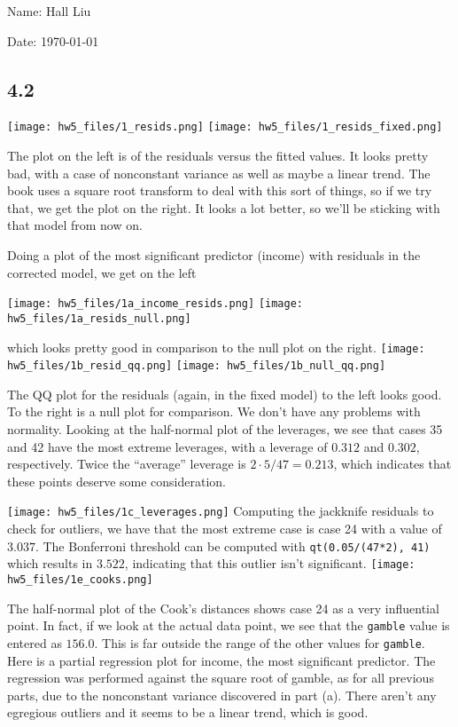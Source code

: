 \documentclass{article}
\begin{document}
Name: Hall Liu

Date: \today 
\vspace{1.5cm}

\subsection*{4.2}
\texttt{[image: hw5\_files/1\_resids.png]}
\texttt{[image: hw5\_files/1\_resids\_fixed.png]}

The plot on the left is of the residuals versus the fitted values. It looks pretty bad, with a case of nonconstant variance as well as maybe a linear trend. The book uses a square root transform to deal with this sort of things, so if we try that, we get the plot on the right. It looks a lot better, so we'll be sticking with that model from now on.

Doing a plot of the most significant predictor (income) with residuals in the corrected model, we get on the left

\texttt{[image: hw5\_files/1a\_income\_resids.png]}
\texttt{[image: hw5\_files/1a\_resids\_null.png]}

which looks pretty good in comparison to the null plot on the right.
\texttt{[image: hw5\_files/1b\_resid\_qq.png]}
\texttt{[image: hw5\_files/1b\_null\_qq.png]}

The QQ plot for the residuals (again, in the fixed model) to the left looks good. To the right is a null plot for comparison. We don't have any problems with normality.
Looking at the half-normal plot of the leverages, we see that cases 35 and 42 have the most extreme leverages, with a leverage of $0.312$ and $0.302$, respectively. Twice the ``average'' leverage is $2\cdot5/47=0.213$, which indicates that these points deserve some consideration.

\texttt{[image: hw5\_files/1c\_leverages.png]}
Computing the jackknife residuals to check for outliers, we have that the most extreme case is case 24 with a value of $3.037$. The Bonferroni threshold can be computed with \verb|qt(0.05/(47*2), 41)| which results in $3.522$, indicating that this outlier isn't significant.
\texttt{[image: hw5\_files/1e\_cooks.png]}

The half-normal plot of the Cook's distances shows case 24 as a very influential point. In fact, if we look at the actual data point, we see that the \verb|gamble| value is entered as $156.0$. This is far outside the range of the other values for \verb|gamble|. 
Here is a partial regression plot for income, the most significant predictor. The regression was performed against the square root of gamble, as for all previous parts, due to the nonconstant variance discovered in part (a). There aren't any egregious outliers and it seems to be a linear trend, which is good. 
\end{document}

